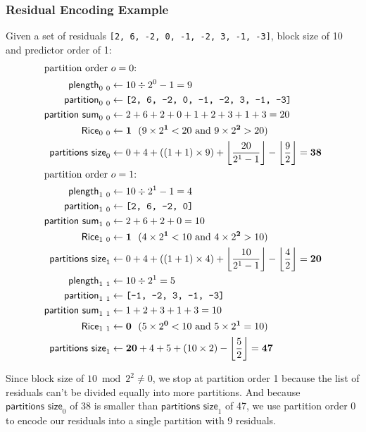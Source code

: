\clearpage

\subsubsection{Residual Encoding Example}
Given a set of residuals \texttt{[2, 6, -2, 0, -1, -2, 3, -1, -3]},
block size of 10 and predictor order of 1:
{
  \begin{align*}
  \intertext{$\text{partition order}~o = 0$:}
  \textsf{plength}_{0~0} &\leftarrow 10 \div 2 ^ 0 - 1 = 9 \\
  \textsf{partition}_{0~0} &\leftarrow \texttt{[2, 6, -2, 0, -1, -2, 3, -1, -3]} \\
  \textsf{partition sum}_{0~0} &\leftarrow 2 + 6 + 2 + 0 + 1 + 2 + 3 + 1 + 3 = 20 \\
  \textsf{Rice}_{0~0} &\leftarrow \textbf{1}~~(9 \times 2 ^ \textbf{1} < 20 \text{ and } 9 \times 2 ^ \textbf{2} > 20) \\
  \textsf{partitions size}_0 &\leftarrow 0 + 4 + ((1 + 1) \times 9) + \left\lfloor\frac{20}{2 ^ 1 - 1}\right\rfloor - \left\lfloor\frac{9}{2}\right\rfloor = \textbf{38} \\
  \intertext{$\text{partition order}~o = 1$:}
  \textsf{plength}_{1~0} &\leftarrow 10 \div 2 ^ 1 - 1 = 4 \\
  \textsf{partition}_{1~0} &\leftarrow \texttt{[2, 6, -2, 0]} \\
  \textsf{partition sum}_{1~0} &\leftarrow 2 + 6 + 2 + 0 = 10 \\
  \textsf{Rice}_{1~0} &\leftarrow \textbf{1}~~(4 \times 2 ^ \textbf{1} < 10 \text{ and } 4 \times 2 ^ \textbf{2} > 10) \\
  \textsf{partitions size}_1 &\leftarrow 0 + 4 + ((1 + 1) \times 4) + \left\lfloor\frac{10}{2 ^ 1 - 1}\right\rfloor - \left\lfloor\frac{4}{2}\right\rfloor = \textbf{20} \\
  \textsf{plength}_{1~1} &\leftarrow 10 \div 2 ^ 1 = 5 \\
  \textsf{partition}_{1~1} &\leftarrow \texttt{[-1, -2, 3, -1, -3]} \\
  \textsf{partition sum}_{1~1} &\leftarrow 1 + 2 + 3 + 1 + 3 = 10 \\
  \textsf{Rice}_{1~1} &\leftarrow \textbf{0}~~(5 \times 2 ^ \textbf{0} < 10 \text{ and } 5 \times 2 ^ \textbf{1} = 10) \\
  \textsf{partitions size}_1 &\leftarrow \textbf{20} + 4 + 5 + (10 \times
  2) - \left\lfloor\frac{5}{2}\right\rfloor = \textbf{47}
\end{align*}}
\par
\noindent
Since block size of $10 \bmod 2 ^ 2 \neq 0$, we stop at partition order 1
because the list of residuals can't be divided equally into more partitions.
And because $\textsf{partitions size}_0$ of 38 is smaller than
$\textsf{partitions size}_1$ of 47, we use partition order 0
to encode our residuals into a single partition with 9 residuals.

